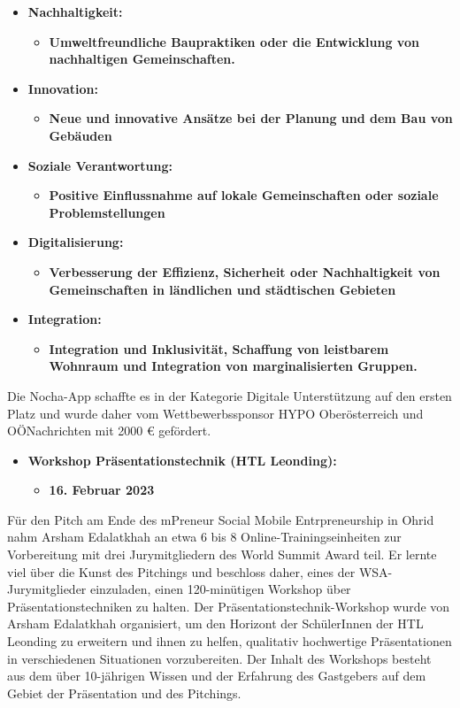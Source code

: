 \begin{itemize}
    \item \textbf{Nachhaltigkeit:}
    \begin{itemize}
        \item \textbf{Umweltfreundliche Baupraktiken oder die Entwicklung von nachhaltigen Gemeinschaften.}
    \end{itemize}
    \item \textbf{Innovation:}
    \begin{itemize}
        \item \textbf{Neue und innovative Ansätze bei der Planung und dem Bau von Gebäuden}
    \end{itemize}
    \item \textbf{Soziale Verantwortung:}
    \begin{itemize}
        \item \textbf{Positive Einflussnahme auf lokale Gemeinschaften oder soziale Problemstellungen}
    \end{itemize}
    \item \textbf{Digitalisierung:}
    \begin{itemize}
        \item \textbf{Verbesserung der Effizienz, Sicherheit oder Nachhaltigkeit von Gemeinschaften in ländlichen und städtischen Gebieten}
    \end{itemize}
    \item \textbf{Integration:}
    \begin{itemize}
        \item \textbf{Integration und Inklusivität, Schaffung von leistbarem Wohnraum und Integration von marginalisierten Gruppen.}
    \end{itemize}
\end{itemize}

Die Nocha-App schaffte es in der Kategorie Digitale Unterstützung auf den ersten Platz und wurde daher vom Wettbewerbssponsor HYPO Oberösterreich und OÖNachrichten mit 2000 € gefördert.


\begin{itemize}
    \item \textbf{Workshop Präsentationstechnik (HTL Leonding):}
    \begin{itemize}
        \item \textbf{16. Februar 2023}
    \end{itemize}
\end{itemize}


Für den Pitch am Ende des mPreneur Social Mobile Entrpreneurship in Ohrid nahm Arsham Edalatkhah an etwa 6 bis 8 Online-Trainingseinheiten zur Vorbereitung mit drei Jurymitgliedern des World Summit Award teil. Er lernte viel über die Kunst des Pitchings und beschloss daher, eines der WSA-Jurymitglieder einzuladen, einen 120-minütigen Workshop über Präsentationstechniken zu halten. Der Präsentationstechnik-Workshop wurde von Arsham Edalatkhah organisiert, um den Horizont der SchülerInnen der HTL Leonding zu erweitern und ihnen zu helfen, qualitativ hochwertige Präsentationen in verschiedenen Situationen vorzubereiten. Der Inhalt des Workshops besteht aus dem über 10-jährigen Wissen und der Erfahrung des Gastgebers auf dem Gebiet der Präsentation und des Pitchings. 

